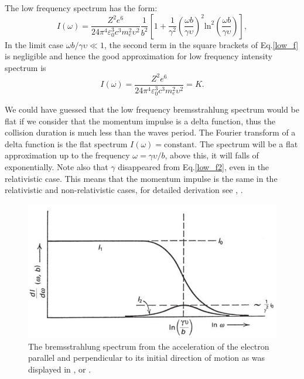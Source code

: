 \documentclass[oneside,a4paper,11pt]{report}
\begin{document}
The low frequency spectrum has the form: 
\begin{equation}
 \label{low_f}
I(\omega) = \frac{Z^2 e^6}{24 \pi^4 \varepsilon_0^3 c^3 m_e^2 \upsilon^2 } \frac{1}{b^2} \left [ 1 + \frac{1}{\gamma^2} \left ( \frac{\omega b}{\gamma \upsilon} \right )^2 \mathrm{ln}^2 \left ( \frac{\omega b}{\gamma \upsilon} \right ) \right ],
\end{equation}
In the limit case $\omega b / \gamma \upsilon \ll 1$, the second term in the square brackets of Eq.\eqref{low_f} 
is negligible and hence the good approximation for low frequency intensity spectrum is 
\begin{equation}
 \label{low_f2}
I(\omega) = \frac{Z^2 e^6}{24 \pi^4 \varepsilon_0^3 c^3 m_e^2 \upsilon^2 } = K.
\end{equation}

We could have guessed that the low frequency bremsstrahlung spectrum would be flat if we consider that the 
momentum impulse is a delta function, thus the collision duration is much less than the waves period. 
The Fourier transform of a delta function is the flat spectrum $I(\omega) = \mathrm{constant}$. 
The spectrum will be a flat approximation up to the frequency $\omega = \gamma \upsilon /b$, above this, 
it will falls of exponentially. 
Note also that $\gamma$ disappeared from Eq.\eqref{low_f2}, even in the relativistic case. 
This means that the momentum impulse is the same in the relativistic and non-relativistic cases, 
for detailed derivation see \citet{longair:1}, \citet{jackson}. 

\begin{figure}[hbt]
\centering
\includegraphics[totalheight=5cm]{plot/brem_jackson}
\caption{The bremsstrahlung spectrum from the acceleration of the electron parallel and perpendicular
to its initial direction of motion as was displayed in \citet{jackson}, or \citet{rybicki:1}.}
\label{jackson_brem} 
\end{figure}
\end{document}
